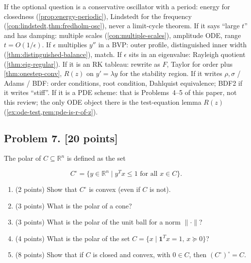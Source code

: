 \documentclass[11pt,a4paper]{article}
\begin{document}
\begin{examnote}
\label{exnote:ode-review}
If the optional question is a conservative oscillator with a period: energy for closedness (\cref{prop:energy-periodic}), Lindstedt for the frequency (\cref{con:lindstedt,thm:fredholm-osc}), never a limit-cycle theorem. If it says ``large \(t\)'' and has damping: multiple scales (\cref{con:multiple-scales}), amplitude ODE, range \(t=O(1/\epsilon)\). If \(\epsilon\) multiplies \(y''\) in a BVP: outer profile, distinguished inner width (\cref{thm:distinguished-balance}), match. If \(\epsilon\) sits in an eigenvalue: Rayleigh quotient (\cref{thm:eig-regular}). If it is an RK tableau: rewrite as \(F\), Taylor for order plus \cref{thm:onestep-conv}, \(R(z)\) on \(y'=\lambda y\) for the stability region. If it writes \(\rho,\sigma\) / Adams / BDF: order conditions, root condition, Dahlquist equivalence; BDF2 if it writes ``stiff''. If it is a PDE scheme: that is Problems~4--5 of this paper, not this review; the only ODE object there is the test-equation lemma \(R(z)\) (\cref{ex:ode-test,rem:pde-is-r-of-z}).
\end{examnote}


\subsection{Problem 7. [20 points]}
The polar of \(C \subseteq \mathbb{R}^{n}\) is defined as the set

\[
C^{\circ} = \bigl\{ y \in \mathbb{R}^{n} \mid y^{T} x \le 1 \text{ for all } x \in C \bigr\}.
\]

\begin{enumerate}[label=(\alph*)]
    \item (2 points) Show that \(C^{\circ}\) is convex (even if \(C\) is not).
    \item (3 points) What is the polar of a cone?
    \item (3 points) What is the polar of the unit ball for a norm \(\|\cdot\|\)?
    \item (4 points) What is the polar of the set \(C = \{ x \mid \mathbf{1}^{T} x = 1,\, x \succeq 0 \}\)?
    \item (8 points) Show that if \(C\) is closed and convex, with \(0 \in C\), then \((C^{\circ})^{\circ} = C\).
\end{enumerate}

\setcounter{section}{7}
\setcounter{theorem}{0}
\setcounter{definition}{0}
\setcounter{remark}{0}
\setcounter{note}{0}
\end{document}
